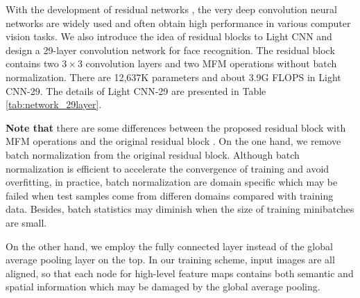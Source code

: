 \documentclass[journal,transmag]{IEEEtran}
\begin{document}
With the development of residual networks \cite{HeZRS16}, the very deep convolution neural networks are widely used and often obtain high performance in various computer vision tasks. We also introduce the idea of residual blocks to Light CNN and design a 29-layer convolution network for face recognition. The residual block contains two $3\times 3$ convolution layers and two MFM operations without batch normalization. There are 12,637K parameters and about 3.9G FLOPS in Light CNN-29. The details of Light CNN-29 are presented in Table \ref{tab:network_29layer}.

\textbf{Note that} there are some differences between the proposed residual block with MFM operations and the original residual block \cite{HeZRS16}. On the one hand, we remove batch normalization from the original residual block. Although batch normalization is efficient to accelerate the convergence of training and avoid overfitting, in practice, batch normalization are domain specific which may be failed when test samples come from differen domains compared with training data. Besides, batch statistics may diminish when the size of training minibatches are small.

On the other hand, we employ the fully connected layer instead of the global average pooling layer on the top. In our training scheme, input images are all aligned, so that each node for high-level feature maps contains both semantic and spatial information which may be damaged by the global average pooling.

\end{document}
